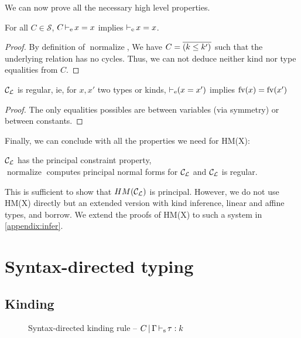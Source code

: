 We can now prove all the necessary high level properties.

\begin{lemma}
  For all $C\in\mathcal S$, $C \operatorname{\vdash_e} x = x$ implies
  $\operatorname{\vdash_e} x = x$.
\end{lemma}
\begin{proof}
  By definition of $\operatorname{normalize}$, We have $C = \overline{(k \leq k')_{{}}}$
  such that the underlying relation has no cycles.
  Thus, we can not deduce neither kind nor type equalities from $C$.
\end{proof}

\begin{property}
  ${\mathcal C_{\mathcal L}}$ is regular, ie, for $x, x'$ two types or kinds,
  $\operatorname{\vdash_e} (x = x')$ implies
  $\operatorname{fv}(x) = \operatorname{fv}(x')$
\end{property}
\begin{proof}
  The only equalities possibles are between variables (via symmetry) or
  between constants.
\end{proof}

Finally, we can conclude with all the properties we need for
HM(X):

\begin{theorem}
  ${\mathcal C_{\mathcal L}}$ has the principal constraint property,\\
  $\operatorname{normalize}$ computes principal normal forms for ${\mathcal C_{\mathcal L}}$
  and ${\mathcal C_{\mathcal L}}$ is regular.
\end{theorem}


This is sufficient to show that $HM({\mathcal C_{\mathcal L}})$ is principal. However,
we do not use HM(X) directly but an extended version with kind inference,
linear and affine types, and borrow.
We extend the proofs of HM(X) to such a system in \cref{appendix:infer}.


\section{Syntax-directed typing}
\label{appendix:sdtyping}

\subsection{Kinding}
%
\begin{figure}[bt]
  \centering
  
  \caption{Syntax-directed kinding rule --
    $C \operatorname{|} \Gamma \operatorname{\vdash_s} \tau : k$}
  \label{rules:sd-kinding}
\end{figure}

